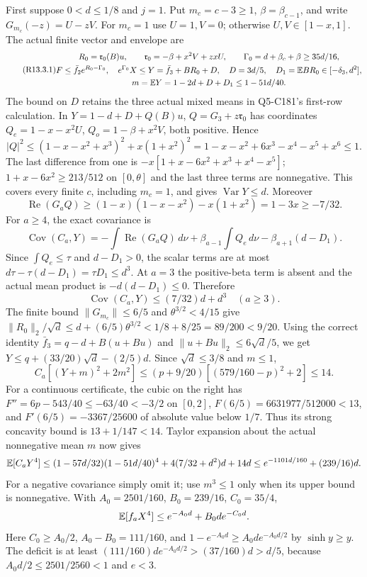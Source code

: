 First suppose $0<d\le1/8$ and $j=1$. Put $m_c=c-3\ge1$,
$\beta=\beta_{c-1}$, and write $G_{m_c}(-z)=U-zV$.
For $m_c=1$ use $U=1,V=0$; otherwise $U,V\in[1-x,1]$.
The actual finite vector and envelope are
\begin{equation}\tag{R13.3.1}\label{eq:R13:terminal}
\begin{gathered}
R_0=\mathfrak r_0(B)u,\qquad
\mathfrak r_0=-\beta+x^2V+zxU,\qquad
\Gamma_0=d+\beta_c+\beta\ge35d/16,\\
F\le\bar f_2e^{R_0-\Gamma_0},\quad
e^{\Gamma_0}X\le Y=\bar f_3+BR_0+D,\quad D=3d/5,\quad
D_1=\mathbb E BR_0\in[-\delta_3,d^2],\\
m=\mathbb E Y=1-2d+D+D_1\le1-51d/40.
\end{gathered}
\end{equation}
The bound on $D$ retains the three actual mixed means in Q5-C181's
first-row calculation. In $Y=1-d+D+Q(B)u$,
$Q=G_3+z\mathfrak r_0$ has coordinates
$Q_e=1-x-x^2U$, $Q_o=1-\beta+x^2V$, both positive. Hence
\[
|Q|^2\le(1-x-x^2+x^3)^2+x(1+x^2)^2
=1-x-x^2+6x^3-x^4-x^5+x^6\le1.
\]
The last difference from one is
$-x[1+x-6x^2+x^3+x^4-x^5]$;
$1+x-6x^2\ge213/512$ on $[0,\theta]$ and the last three terms
are nonnegative. This covers every finite $c$, including $m_c=1$,
and gives $\operatorname{Var}Y\le d$.
Moreover
\[
\operatorname{Re}(G_aQ)\ge(1-x)(1-x-x^2)-x(1+x^2)=1-3x\ge-7/32.
\]
For $a\ge4$, the exact covariance is
\[
\operatorname{Cov}(C_a,Y)
=-\int\operatorname{Re}(G_aQ)\,d\nu
+\beta_{a-1}\int Q_e\,d\nu-\beta_{a+1}(d-D_1).
\]
Since $\int Q_e\le\tau$ and $d-D_1>0$, the scalar terms are at
most $d\tau-\tau(d-D_1)=\tau D_1\le d^3$.
At $a=3$ the positive-beta term is absent and the actual mean product
is $-d(d-D_1)\le0$. Therefore
\begin{equation}\tag{R13.3.7}\label{eq:R13:covariance}
\operatorname{Cov}(C_a,Y)\le(7/32)d+d^3\quad(a\ge3).
\end{equation}
The finite bound $\|G_{m_c}\|\le6/5$ and
$\theta^{3/2}<4/15$ give
$\|R_0\|_2/\sqrt d\le d+(6/5)\theta^{3/2}
<1/8+8/25=89/200<9/20$.
Using the correct identity
$\bar f_3=q-d+B(u+Bu)$ and
$\|u+Bu\|_2\le6\sqrt d/5$, we get
$Y\le q+(33/20)\sqrt d-(2/5)d$.
Since $\sqrt d\le3/8$ and $m\le1$,
\[
C_a[(Y+m)^2+2m^2]
\le(p+9/20)[(579/160-p)^2+2]\le14.
\]
For a continuous certificate, the cubic on the right has
$F''=6p-543/40\le-63/40<-3/2$ on $[0,2]$,
$F(6/5)=6631977/512000<13$, and
$F'(6/5)=-3367/25600$ of absolute value below $1/7$.
Thus its strong concavity bound is $13+1/147<14$.
Taylor expansion about the actual nonnegative mean $m$ now gives
\[
\mathbb E[C_aY^4]\le(1-57d/32)(1-51d/40)^4
+4(7/32+d^2)d+14d
\le e^{-1101d/160}+(239/16)d.
\]
For a negative covariance simply omit it; use $m^3\le1$ only when
its upper bound is nonnegative. With
$A_0=2501/160$, $B_0=239/16$, $C_0=35/4$,
\[
\mathbb E[f_aX^4]\le e^{-A_0d}+B_0de^{-C_0d}.
\]
Here $C_0\ge A_0/2$, $A_0-B_0=111/160$, and
$1-e^{-A_0d}\ge A_0de^{-A_0d/2}$ by $\sinh y\ge y$.
The deficit is at least
$(111/160)de^{-A_0d/2}>(37/160)d>d/5$, because
$A_0d/2\le2501/2560<1$ and $e<3$.

